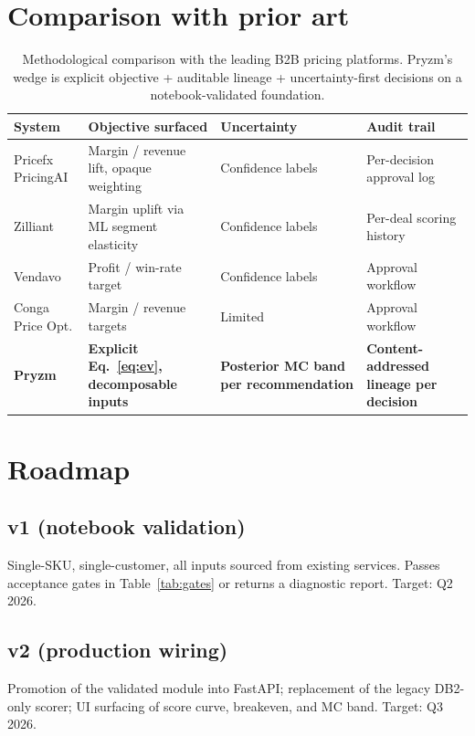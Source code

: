 \documentclass[11pt,a4paper]{article}
\begin{document}
\section{Comparison with prior art}

\begin{table}[ht]
\centering
\small
\caption{Methodological comparison with the leading B2B pricing platforms. Pryzm's wedge is explicit objective + auditable lineage + uncertainty-first decisions on a notebook-validated foundation.}
\label{tab:compare}
\begin{tabularx}{\textwidth}{lXXX}
\toprule
\textbf{System} & \textbf{Objective surfaced} & \textbf{Uncertainty} & \textbf{Audit trail} \\
\midrule
Pricefx PricingAI \cite{pricefx} & Margin / revenue lift, opaque weighting & Confidence labels & Per-decision approval log \\
Zilliant \cite{zilliant} & Margin uplift via ML segment elasticity & Confidence labels & Per-deal scoring history \\
Vendavo \cite{vendavo} & Profit / win-rate target & Confidence labels & Approval workflow \\
Conga Price Opt. \cite{conga} & Margin / revenue targets & Limited & Approval workflow \\
\midrule
\textbf{Pryzm} & \textbf{Explicit Eq.~\ref{eq:ev}, decomposable inputs} & \textbf{Posterior MC band per recommendation} & \textbf{Content-addressed lineage per decision} \\
\bottomrule
\end{tabularx}
\end{table}

\section{Roadmap}

\subsection{v1 (notebook validation)}
Single-SKU, single-customer, all inputs sourced from existing services. Passes acceptance gates in Table~\ref{tab:gates} or returns a diagnostic report. Target: Q2 2026.

\subsection{v2 (production wiring)}
Promotion of the validated module into FastAPI; replacement of the legacy DB2-only scorer; UI surfacing of score curve, breakeven, and MC band. Target: Q3 2026.
\end{document}
